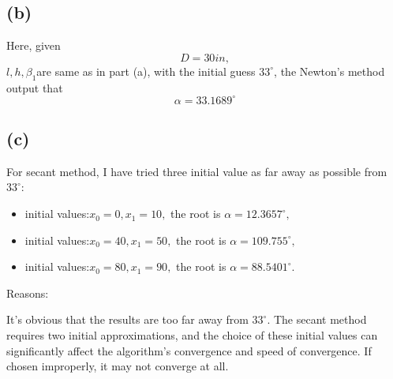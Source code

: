 \documentclass[a4paper]{article}
\begin{document}
\subsection*{(b)}
Here, given $$D = 30 in,$$ $l,h,\beta_1$are same as in part (a), with the initial guess $33^{\circ}$, the Newton's method output that
$$\alpha = 33.1689^{\circ} $$
\subsection*{(c)}
For secant method, I have tried three initial value as far away as possible from $33^{\circ}$:
\begin{itemize}  
  \item initial values:$x_0 = 0 , x_1 = 10,$ the root is $\alpha = 12.3657^{\circ},$  
  \item initial values:$x_0 = 40 , x_1 = 50,$ the root is $\alpha = 109.755^{\circ},$   
  \item initial values:$x_0 = 80 , x_1 = 90,$ the root is $\alpha = 88.5401^{\circ}.$  
\end{itemize}  
Reasons:

It's obvious that the results are too far away from $33^{\circ}.$ The secant method requires two initial approximations, 
and the choice of these initial values can significantly affect the algorithm's convergence and speed of convergence. If chosen improperly, it may not converge at all.
\end{document}
